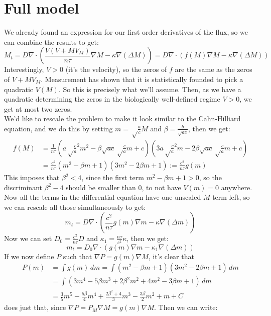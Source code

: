 \documentclass[a4paper]{jpconf}
\begin{document}
\section{Full model}
We already found an expression for our first order derivatives of the flux, so we can combine the results to get:
\[
M_t = D\nabla \cdot \left(\frac{V(V+MV_M)}{n\tau} \nabla M -\kappa \nabla (\Delta M)\right) = D\nabla \cdot \left(f(M) \nabla M -\kappa \nabla (\Delta M)\right)
\]
Interestingly, $V>0$ (it's the velocity), so the zeros of $f$ are the same as the zeros of $V+MV_M$. Measurement has shown that it is statistically founded to pick a quadratic $V(M)$. So this is precisely what we'll assume. Then, as we have a quadratic determining the zeros in the biologically well-defined regime $V>0$, we get at most two zeros. \\
We'd like to rescale the problem to make it look similar to the Cahn-Hilliard equation, and we do this by setting $m = \sqrt\frac{a}{c}M$ and $\beta = \frac{b}{\sqrt{ac}}$, then we get:
\[\begin{aligned}
 f(M)&=\frac{1}{n\tau } \left(a \sqrt\frac{c}{a}^2 m^2-\beta\sqrt{ac}\sqrt\frac{c}{a}m+c\right)\left( 3a \sqrt\frac{c}{a}^2 m-2\beta\sqrt{ac}\sqrt\frac{c}{a}m+c\right)\\
&=\frac{c^2}{n\tau}(m^2-\beta m+1)(3m^2-2\beta m+1):= \frac{c^2}{n\tau }g(m)
\end{aligned}\]
This imposes that $\beta^2<4$, since the first term $m^2-\beta m+1>0$, so the discriminant $\beta^2-4$ should be smaller than $0$, to not have $V(m)=0$ anywhere. Now all the terms in the differential equation have one unscaled $M$ term left, so we can rescale all those simultaneously to get:
\[
m_t = D\nabla \cdot \left(\frac{c^2}{n\tau}g(m) \nabla m -\kappa \nabla (\Delta m)\right)
\]
Now we can set $D_0 = \frac{c^2}{n\tau}D$ and $\kappa_1 =\frac{n\tau}{c^2}\kappa$, then we get:
\[
m_t = D_0\nabla \cdot \left(g(m) \nabla m -\kappa_1 \nabla (\Delta m)\right)
\]
If we now define $P$ such that $\nabla P=g(m)\nabla M$, it's clear that 
\[\begin{aligned}P(m)&=\int g(m) \, dm=
\int (m^2 - \beta m + 1)(3m^2 - 2\beta m + 1) \, dm \\
&=\int (3m^4 - 5\beta m^3 + 2\beta^2 m^2 + 4m^2 - 3\beta m + 1) \, dm\\
&= \frac{3}{5}m^5 - \frac{5\beta}{4}m^4 + \frac{2\beta^2 + 4}{3}m^3 - \frac{3\beta}{2}m^2 + m + C\end{aligned}\]
does just that, since $\nabla P=P_M\nabla M = g(m)\nabla M$. Then we can write:
\end{document}
